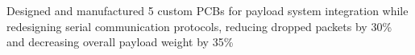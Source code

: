     \vspace{0.10 cm}
    \begin{onecolentry}
        \begin{highlights}
            \item Designed and manufactured 5 custom PCBs for payload system integration while redesigning serial communication protocols, reducing dropped packets by 30\% and decreasing overall payload weight by 35\%
        \end{highlights}
    \end{onecolentry}

